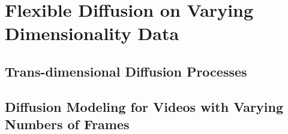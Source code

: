 \chapter{Flexible Diffusion on Varying Dimensionality Data}
\label{sec:tddm}

\section{Trans-dimensional Diffusion Processes}

\section{Diffusion Modeling for Videos with Varying Numbers of Frames}